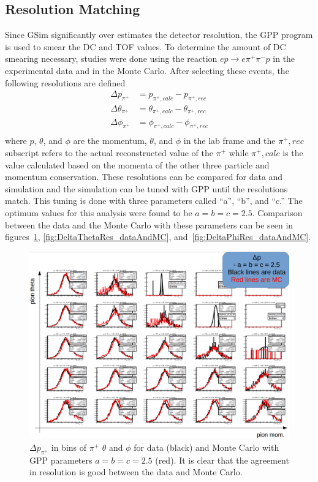 \subsection{Resolution Matching}
\label{subsec:ResolutionMatching}
%
Since GSim significantly over estimates the detector resolution, the GPP program is used to smear the DC and TOF values.
To determine the amount of DC smearing necessary, studies were done using the reaction $ep \rightarrow e\pi^+ \pi^- p$ in the experimental data and in the Monte Carlo.
After selecting these events, the following resolutions are defined
%
\begin{equation}
\label{eq:resolutionDefinitions}
\begin{split}
\Delta p_{\pi^+} &= p_{\pi^+, calc} - p_{\pi^+, rec} \\
\Delta \theta_{\pi^+} &= \theta_{\pi^+, calc} - \theta_{\pi^+, rec} \\
\Delta \phi_{\pi^+} &= \phi_{\pi^+, calc} - \phi_{\pi^+, rec} \\
\end{split}
\end{equation}
%
where $p$, $\theta$, and $\phi$ are the momentum, $\theta$, and $\phi$ in the lab frame and the $\pi^+, rec$ subscript refers to the actual reconstructed value of the $\pi^+$ while $\pi^+, calc$ is the value calculated based on the momenta of the other three particle and momentum conservation.
These resolutions can be compared for data and simulation and the simulation can be tuned with GPP until the resolutions match.
This tuning is done with three parameters called ``a'', ``b'', and ``c.''
The optimum values for this analysis were found to be $a = b = c = 2.5$.
Comparison between the data and the Monte Carlo with these parameters can be seen in figures~\ref{fig:DeltapRes_dataAndMC}, \ref{fig:DeltaThetaRes_dataAndMC}, and~\ref{fig:DeltaPhiRes_dataAndMC}.
%
\begin{figure}
\centering
\includegraphics[width=8.5in]{figures/DeltapRes_dataAndMC.png}
\caption{$\Delta p_{\pi^+}$ in bins of $\pi^+$ $\theta$ and $\phi$ for data (black) and Monte Carlo with GPP parameters $a = b = c = 2.5$ (red). It is clear that the agreement in resolution is good between the data and Monte Carlo.}
\label{fig:DeltapRes_dataAndMC}
\end{figure}
